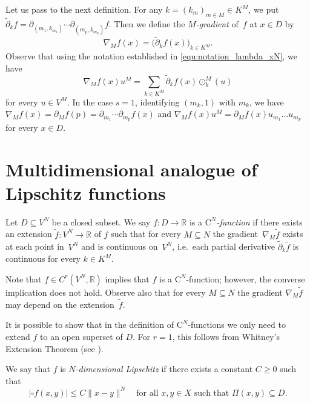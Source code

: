 \documentclass{amsart}
\theoremstyle{plain}%
\theoremstyle{definition}
\theoremstyle{remark}
\begin{document}
Let us pass to the next definition.
For any $k=(k_m)_{m\in M}\in K^M$, we put $\widetilde\partial_kf=\partial_{(m_1, k_{m_1})}
\cdots\partial_{(m_p, k_{m_p})}f$. Then we define the \emph{$M$\nobreakdash-gradient} of~$f$ at $x\in D$ by
\begin{equation*}
\nabla\!_Mf(x)=\big(\widetilde\partial_kf(x)\big)_{k\in K^M}.
\end{equation*}
Observe that using the notation established in \eqref{equ:notation_lambda_xN}, we have
\begin{equation*}
\nabla\!_Mf(x)u^M =\sum_{k\in K^M}\widetilde{\partial}_kf(x)\odot^M_k(u)
\end{equation*}
for every $u\in V^M$.
In the case $s=1$, identifying $(m_k,1)$ with $m_k$, we have 
$\nabla\!_Mf(x)=\partial_Mf(p)=\partial_{m_1}
\cdots \partial_{m_p}f(x)$ and $\nabla\!_M f(x)u^M=\partial_Mf(x)u_{m_1}
\dots u_{m_p}$ for every $x\in D$.


\section{Multidimensional analogue of Lipschitz functions}\label{section5}
Let $D\subseteq V^N$ be a closed subset.
We say $f\colon D\to\mathbb R$ is a \emph{$\mathrm{C}^N$\nobreakdash-function} if there exists an extension $\widetilde{f}\colon V^N\to\mathbb{R}$ of $f$ such that for every $M\subseteq N$  the gradient~$\nabla\!_{M}\widetilde{f}$ exists at each point in~$V^N$ and is continuous on~$V^N$, i.e.\ each partial derivative $\widetilde{\partial}_k\widetilde{f}$ is continuous for every $k\in K^M$.

Note that $f\in C^r(V^N,\mathbb R)$ implies that $f$ is a $\mathrm{C}^N$\nobreakdash-function; however, the converse implication does not hold.
Observe also that for every $M\subseteq N$ the gradient $\nabla\!_M\widetilde{f}$ may depend on the extension~$\widetilde{f}$.

It is possible to show that in the definition of $\mathrm{C}^N$\nobreakdash-functions we only need to extend $f$ to an open superset of $D$.  For $r=1$, this follows from Whitney’s Extension Theorem (see \cite[Theorem 6.5.1]{EvGa}).

We say that $f$ is \emph{$N$\nobreakdash-dimensional Lipschitz} if there exists a constant $C\ge 0$ such that 
\begin{equation*}
\left|\square f(x,y)\right|\le C\|x-y\|^N\quad\text{for all }x,y\in X
\text{ such that }\Pi(x,y)\subseteq D.
\end{equation*}
\end{document}
